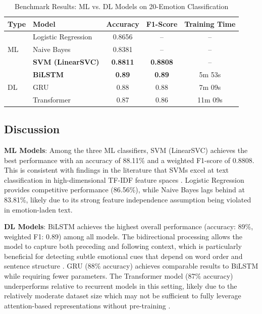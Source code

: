 \documentclass{article}
\begin{document}
\begin{table}[H]
\centering
\caption{Benchmark Results: ML vs. DL Models on 20-Emotion Classification}
\label{tab:benchmark}
\begin{tabular}{llccc}
\toprule
\textbf{Type} & \textbf{Model} & \textbf{Accuracy} & \textbf{F1-Score} & \textbf{Training Time} \\
\midrule
\multirow{3}{*}{ML}
& Logistic Regression & 0.8656 & -- & -- \\
& Naive Bayes & 0.8381 & -- & -- \\
& \textbf{SVM (LinearSVC)} & \textbf{0.8811} & \textbf{0.8808} & -- \\
\midrule
\multirow{3}{*}{DL}
& \textbf{BiLSTM} & \textbf{0.89} & \textbf{0.89} & 5m 53s \\
& GRU & 0.88 & 0.88 & 7m 09s \\
& Transformer & 0.87 & 0.86 & 11m 09s \\
\bottomrule
\end{tabular}
\end{table}

\subsection{Discussion}

\textbf{ML Models}: Among the three ML classifiers, SVM (LinearSVC) achieves the best performance with an accuracy of 88.11\% and a weighted F1-score of 0.8808. This is consistent with findings in the literature that SVMs excel at text classification in high-dimensional TF-IDF feature spaces \cite{joachims1998text}. Logistic Regression provides competitive performance (86.56\%), while Naive Bayes lags behind at 83.81\%, likely due to its strong feature independence assumption being violated in emotion-laden text.

\textbf{DL Models}: BiLSTM achieves the highest overall performance (accuracy: 89\%, weighted F1: 0.89) among all models. The bidirectional processing allows the model to capture both preceding and following context, which is particularly beneficial for detecting subtle emotional cues that depend on word order and sentence structure \cite{schuster1997bidirectional}. GRU (88\% accuracy) achieves comparable results to BiLSTM while requiring fewer parameters. The Transformer model (87\% accuracy) underperforms relative to recurrent models in this setting, likely due to the relatively moderate dataset size which may not be sufficient to fully leverage attention-based representations without pre-training \cite{vaswani2017attention}.
\end{document}
